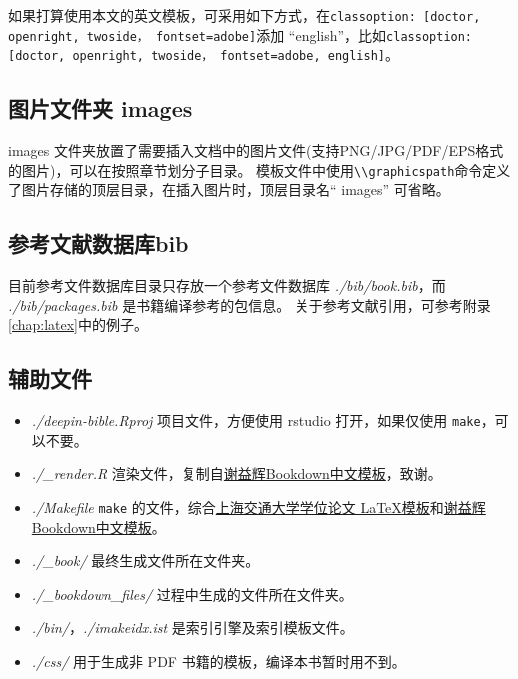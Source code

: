 \documentclass[doctor,openright,twoside]{sjtuthesis}
\providecommand{\tightlist}{%
    \setlength{\itemsep}{0pt}\setlength{\parskip}{0pt}}
\newcommand{\passthrough}[1]{#1}
\theoremstyle{plain}
\theoremstyle{definition}
\theoremstyle{remark}
\theoremstyle{ocrenumbox}
\theoremstyle{plain}
\begin{document}
如果打算使用本文的英文模板，可采用如下方式，在\passthrough{\lstinline!classoption: [doctor, openright, twoside， fontset=adobe]!}添加 ``english''，比如\passthrough{\lstinline!classoption: [doctor, openright, twoside， fontset=adobe, english]!}。

\hypertarget{intro:fig}{%
\subsection{图片文件夹 images}\label{intro:fig}}

images 文件夹放置了需要插入文档中的图片文件(支持PNG/JPG/PDF/EPS格式的图片)，可以在按照章节划分子目录。
模板文件中使用\passthrough{\lstinline!\\graphicspath!}命令定义了图片存储的顶层目录，在插入图片时，顶层目录名`` images'' 可省略。

\hypertarget{intro:bib}{%
\subsection{参考文献数据库bib}\label{intro:bib}}

目前参考文件数据库目录只存放一个参考文件数据库 \emph{./bib/book.bib}，而 \emph{./bib/packages.bib} 是书籍编译参考的包信息。
关于参考文献引用，可参考附录\ref{chap:latex}中的例子。

\hypertarget{section-151}{%
\subsection{辅助文件}\label{section-151}}

\begin{itemize}
\tightlist
\item
  \emph{./deepin-bible.Rproj} 项目文件，方便使用 rstudio 打开，如果仅使用 \passthrough{\lstinline!make!}，可以不要。
\item
  \emph{./\_render.R} 渲染文件，复制自\href{https://github.com/yihui/bookdown-chinese}{谢益辉Bookdown中文模板}，致谢。
\item
  \emph{./Makefile} \passthrough{\lstinline!make!} 的文件，综合\href{https://github.com/sjtug/SJTUThesis}{上海交通大学学位论文 \LaTeX 模板}和\href{https://github.com/yihui/bookdown-chinese}{谢益辉Bookdown中文模板}。
\item
  \emph{./\_book/} 最终生成文件所在文件夹。
\item
  \emph{./\_bookdown\_files/} 过程中生成的文件所在文件夹。
\item
  \emph{./bin/}，\emph{./imakeidx.ist} 是索引引擎及索引模板文件。
\item
  \emph{./css/} 用于生成非 PDF 书籍的模板，编译本书暂时用不到。
\end{itemize}
\end{document}
